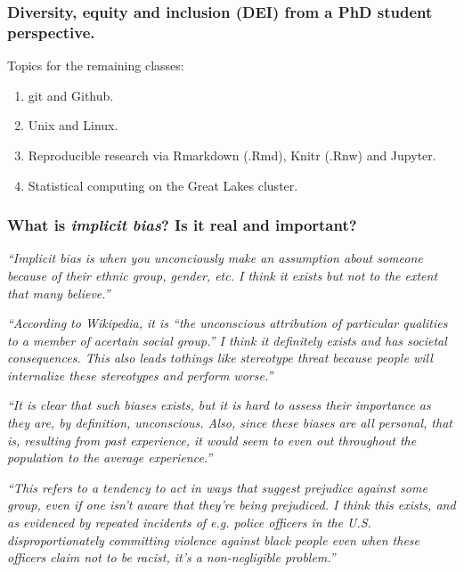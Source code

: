 \documentclass[12pt]{beamer}
\newcommand\ans[1]{{\it ``#1''}}
\newcommand\gap{\vspace{5mm}}
\begin{document}

\begin{frame}
  \frametitle{Diversity, equity and inclusion (DEI) from a PhD student perspective.}

  Topics for the remaining classes:
  \begin{enumerate}
  \item git and Github.
  \item Unix and Linux.
  \item Reproducible research via Rmarkdown (.Rmd), Knitr (.Rnw) and Jupyter.
  \item Statistical computing on the Great Lakes cluster.
  \end{enumerate}
  
\end{frame}

\begin{frame} %

  \frametitle{ What is {\em implicit bias}? Is it real and important?}


  \ans{Implicit bias is when you unconciously make an assumption about someone because of their ethnic group, gender, etc.  I think it exists but not to the extent that many believe.}

  \gap
  
  \ans{According  to  Wikipedia,  it  is  ``the  unconscious  attribution  of  particular  qualities  to  a  member  of  acertain  social  group.''  I  think  it  definitely  exists  and  has  societal  consequences.   This  also  leads  tothings like stereotype threat because people will internalize these stereotypes and perform worse.}

\end{frame}
\begin{frame}
  
  \ans{It is clear that such biases exists, but it is hard to assess their importance as they are, by definition, unconscious.  Also, since these biases are all personal, that is, resulting from  past  experience,  it  would  seem  to  even  out  throughout  the  population  to  the average experience.}

  \gap
  
\ans{This refers to a tendency to act in ways that suggest prejudice against some group, even if one isn't aware that they're being prejudiced.  I think this exists, and as evidenced by repeated incidents of e.g.  police officers in the U.S. disproportionately committing violence against  black  people  even  when  these  officers  claim  not  to  be  racist,  it’s  a non-negligible problem.}
  
\end{frame}
\end{document}

